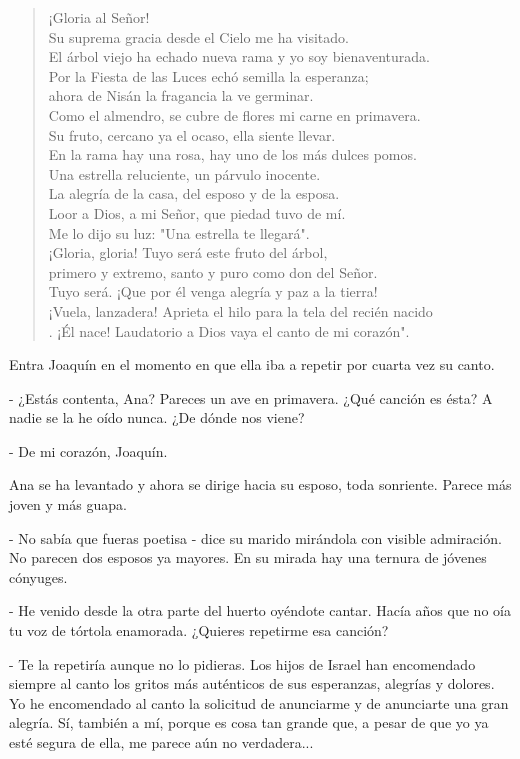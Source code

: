 \documentclass[12pt, twoside, openright]{book} %
\begin{document}
\begin{verse}
¡Gloria al Señor! \\
Su suprema gracia desde el Cielo me ha visitado. \\
El árbol viejo ha echado nueva rama y yo soy bienaventurada. \\
Por la Fiesta de las Luces echó semilla la esperanza; \\
ahora de Nisán la fragancia la ve germinar. \\
Como el almendro, se cubre de flores mi carne en primavera. \\
Su fruto, cercano ya el ocaso, ella siente llevar. \\
En la rama hay una rosa, hay uno de los más dulces pomos. \\
Una estrella reluciente, un párvulo inocente. \\
La alegría de la casa, del esposo y de la esposa. \\
Loor a Dios, a mi Señor, que piedad tuvo de mí. \\
Me lo dijo su luz: "Una estrella te llegará". \\
¡Gloria, gloria! Tuyo será este fruto del árbol, \\
primero y extremo, santo y puro como don del Señor. \\
Tuyo será. ¡Que por él venga alegría y paz a la tierra! \\
¡Vuela, lanzadera! Aprieta el hilo para la tela del recién nacido\\. 
¡Él nace! Laudatorio a Dios vaya el canto de mi corazón". 
\end{verse}
Entra Joaquín en el momento en que ella iba a repetir por cuarta vez su canto. 

- ¿Estás contenta, Ana? Pareces un ave en primavera. ¿Qué canción es ésta? A nadie se la he oído nunca. ¿De dónde nos viene? 

- De mi corazón, Joaquín. 

 Ana se ha levantado y ahora se dirige hacia su esposo, toda sonriente. Parece más joven y más guapa. 

- No sabía que fueras poetisa - dice su marido mirándola con visible admiración. No parecen dos esposos ya mayores. En su mirada hay una ternura de jóvenes cónyuges. 

- He venido desde la otra parte del huerto oyéndote cantar. Hacía años que no oía tu voz de tórtola enamorada. ¿Quieres repetirme esa canción? 

- Te la repetiría aunque no lo pidieras. Los hijos de Israel han encomendado siempre al canto los gritos más auténticos de sus esperanzas, alegrías y dolores. Yo he encomendado al canto la solicitud de anunciarme y de anunciarte una gran alegría. Sí, también a mí, porque es cosa tan grande que, a pesar de que yo ya esté segura de ella, me parece aún no verdadera... 
\end{document}
